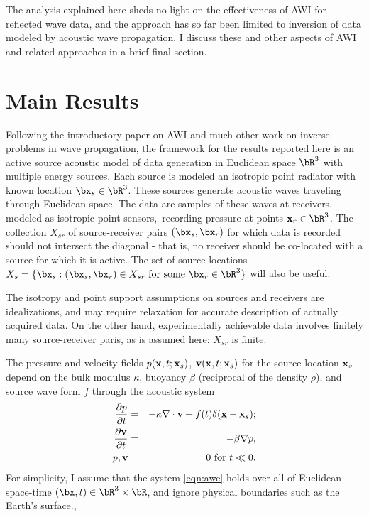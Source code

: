 The analysis explained here sheds no light on the effectiveness of AWI
for reflected wave data, and the approach has so far been limited to
inversion of data modeled by acoustic wave propagation. I discuss
these and other aspects of AWI and related approaches in a brief final
section.

\section{Main Results}

Following the introductory paper on AWI \cite[]{Warner:16} and much
other work on inverse problems in wave propagation, the framework for
the results reported here is an
active source acoustic model of data generation in Euclidean space
$\bR^3$ with multiple energy sources. Each source is modeled an isotropic point radiator
with known location $\bx_s\in \bR^3$. These
sources generate acoustic waves traveling through Euclidean space. The
data are samples of these waves at receivers, modeled as isotropic
point sensors,\ recording pressure at points
${\bf x}_r \in \bR^3$. The collection $X_{sr}$ of source-receiver pairs
$(\bx_s,\bx_r)$ for which data is recorded should not intersect the
diagonal - that is, no receiver should be co-located with a source for
which it is active. The set of source locations $X_s = \{\bx_s: (\bx_s,\bx_r) \in X_{sr}
\mbox{ for some } \bx_r \in \bR^3\}$ will also be useful.

The isotropy and point support assumptions on sources and receivers
are idealizations, and may require relaxation for accurate description of 
actually acquired data. On the other hand, experimentally achievable
data involves finitely many source-receiver paris, as is assumed here:
$X_{sr}$ is finite. 
  
The pressure and velocity fields $p({\bf x},t;{\bf x}_s)$,
${\bf v}({\bf x},t;{\bf x}_s)$ for the source location ${\bf x}_s$
depend on the bulk modulus $\kappa$, buoyancy $\beta$
(reciprocal of the density $\rho$), and source wave
form $f$ through the acoustic system
\begin{eqnarray}
  \label{eqn:awe}
 \frac{\partial p}{\partial t} & = &- \kappa \nabla \cdot {\bf v} +
                                    f(t) \delta({\bf x}-{\bf x}_s); \nonumber \\
\frac{\partial {\bf v}}{\partial t} & = & - \beta \nabla p, \nonumber \\ 
p, {\bf v} & = & 0 \mbox{ for }  t \ll 0.
\end{eqnarray}
For simplicity, I assume that the system \ref{eqn:awe} holds over all of Euclidean
space-time $(\bx,t) \in \bR^3 \times \bR$, and ignore physical
boundaries such as the Earth's surface.,


